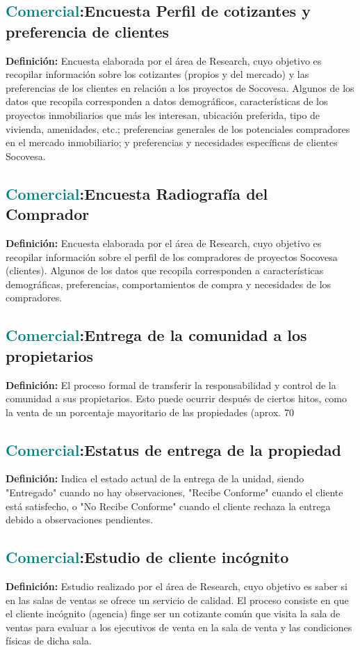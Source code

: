 \documentclass[12pt]{article}
\begin{document}
\subsection{\textcolor{teal}{Comercial}:{Encuesta Perfil de cotizantes y preferencia de clientes}}
\textbf{Definición:} Encuesta elaborada por el área de Research, cuyo objetivo es recopilar información sobre los cotizantes (propios y del mercado) y las preferencias de los clientes en relación a los proyectos de Socovesa. Algunos de los datos que recopila corresponden a datos demográficos, características de los proyectos inmobiliarios que más les interesan, ubicación preferida, tipo de vivienda, amenidades, etc.; preferencias generales de los potenciales compradores en el mercado inmobiliario; y preferencias y necesidades específicas de clientes Socovesa.
\subsection{\textcolor{teal}{Comercial}:{Encuesta Radiografía del Comprador}}
\textbf{Definición:} Encuesta elaborada por el área de Research, cuyo objetivo es recopilar información sobre el perfil de los compradores de proyectos Socovesa (clientes). Algunos de los datos que recopila corresponden a características demográficas, preferencias, comportamientos de compra y necesidades de los compradores.
\subsection{\textcolor{teal}{Comercial}:{Entrega de la comunidad a los propietarios}}
\textbf{Definición:} El proceso formal de transferir la responsabilidad y control de la comunidad a sus propietarios. Esto puede ocurrir después de ciertos hitos, como la venta de un porcentaje mayoritario de las propiedades (aprox. 70%
\subsection{\textcolor{teal}{Comercial}:{Estatus de entrega de la propiedad}}
\textbf{Definición:} Indica el estado actual de la entrega de la unidad, siendo "Entregado" cuando no hay observaciones, "Recibe Conforme" cuando el cliente está satisfecho, o "No Recibe Conforme" cuando el cliente rechaza la entrega debido a observaciones pendientes.
\subsection{\textcolor{teal}{Comercial}:{Estudio de cliente incógnito}}
\textbf{Definición:} Estudio realizado por el área de Research, cuyo objetivo es saber si en las salas de ventas se ofrece un servicio de calidad. El proceso consiste en que el cliente incógnito (agencia) finge ser un cotizante común que visita la sala de ventas para evaluar a los ejecutivos de venta en la sala de venta y las condiciones físicas de dicha sala.
\end{document}
